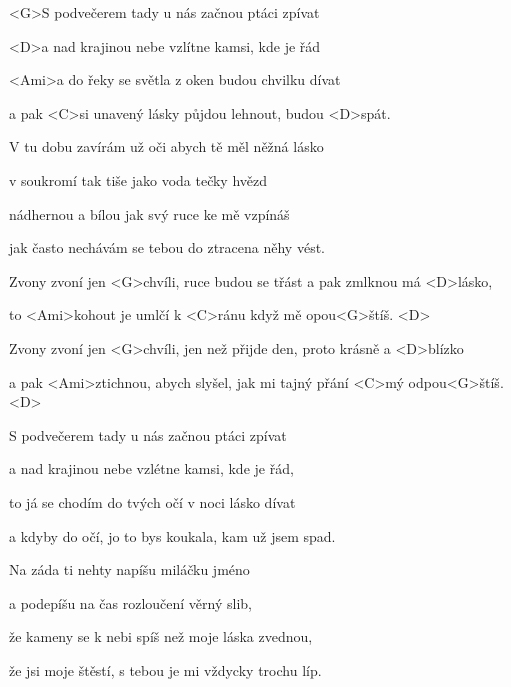 

\zs
<G>S podvečerem tady u nás začnou ptáci zpívat 

<D>a nad krajinou nebe vzlítne kamsi, kde je řád 

<Ami>a do řeky se světla z oken budou chvilku dívat 

a pak <C>si unavený lásky půjdou lehnout, budou <D>spát. 
\ks

\zs
V tu dobu zavírám už oči abych tě měl něžná lásko 

v soukromí tak tiše jako voda tečky hvězd 

nádhernou a bílou jak svý ruce ke mě vzpínáš 

jak často nechávám se tebou do ztracena něhy vést. 
\ks

\zr
Zvony zvoní jen <G>chvíli, ruce budou se třást 
a pak zmlknou má <D>lásko, 

to <Ami>kohout je umlčí k <C>ránu když mě opou<G>štíš. <D>

Zvony zvoní jen <G>chvíli, jen než přijde den, 
proto krásně a <D>blízko 

a pak <Ami>ztichnou, abych slyšel, 
jak mi tajný přání <C>mý odpou<G>štíš. <D>
\kr

\zs
S podvečerem tady u nás začnou ptáci zpívat 

a nad krajinou nebe vzlétne kamsi, kde je řád, 

to já se chodím do tvých očí v noci lásko dívat 

a kdyby do očí, jo to bys koukala, kam už jsem spad. 
\ks

\zs
Na záda ti nehty napíšu miláčku jméno 

a podepíšu na čas rozloučení věrný slib, 

že kameny se k nebi spíš než moje láska zvednou, 

že jsi moje štěstí, s tebou je mi vždycky trochu líp. 
\ks

\zr
\kr

\kp

